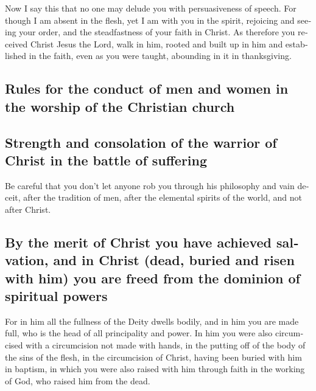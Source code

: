\begin{paracol}{2}
\begin{otherlanguage}{english}
 Now I say this that no one may delude you with
persuasiveness of speech.  For though I am absent in the
flesh, yet I am with you in the spirit, rejoicing and seeing your order,
and the steadfastness of your faith in Christ.  As
therefore you received Christ Jesus the Lord, walk in him,
 rooted and built up in him and established in the faith,
even as you were taught, abounding in it in thanksgiving.

\hypertarget{rules-for-the-conduct-of-men-and-women-in-the-worship-of-the-christian-church}{%
\subsection{Rules for the conduct of men and women in the worship of the
Christian
church}\label{rules-for-the-conduct-of-men-and-women-in-the-worship-of-the-christian-church}}

\hypertarget{strength-and-consolation-of-the-warrior-of-christ-in-the-battle-of-suffering}{%
\subsection{Strength and consolation of the warrior of Christ in the
battle of
suffering}\label{strength-and-consolation-of-the-warrior-of-christ-in-the-battle-of-suffering}}

 Be careful that you don't let anyone rob you through his
philosophy and vain deceit, after the tradition of men, after the
elemental spirits of the world, and not after Christ.

\hypertarget{by-the-merit-of-christ-you-have-achieved-salvation-and-in-christ-dead-buried-and-risen-with-him-you-are-freed-from-the-dominion-of-spiritual-powers}{%
\subsection{By the merit of Christ you have achieved salvation, and in
Christ (dead, buried and risen with him) you are freed from the dominion
of spiritual
powers}\label{by-the-merit-of-christ-you-have-achieved-salvation-and-in-christ-dead-buried-and-risen-with-him-you-are-freed-from-the-dominion-of-spiritual-powers}}

 For in him all the fullness of the Deity dwells bodily,
 and in him you are made full, who is the head of all
principality and power.  In him you were also circumcised
with a circumcision not made with hands, in the putting off of the body
of the sins of the flesh, in the circumcision of Christ, 
having been buried with him in baptism, in which you were also raised
with him through faith in the working of God, who raised him from the
dead.


\end{otherlanguage}
\end{paracol}
